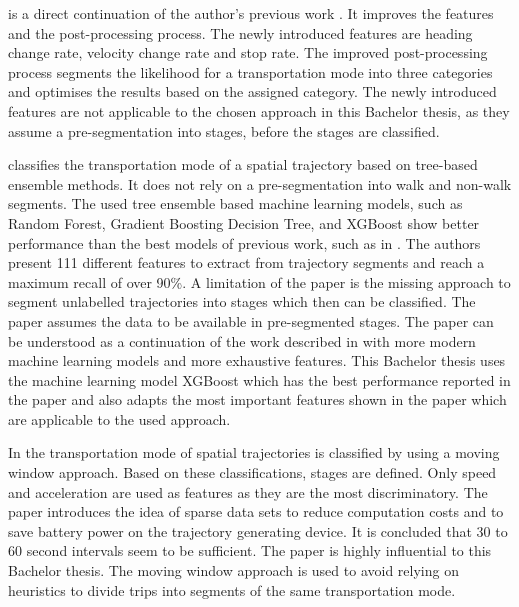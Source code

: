 \cite{zheng2008understanding} is a direct continuation of the author's previous work \cite{Zheng2008}. It improves the features and the post-processing process. The newly introduced features are heading change rate, velocity change rate and stop rate. The improved post-processing process segments the likelihood for a transportation mode into three categories and optimises the results based on the assigned category. \newline
The newly introduced features are not applicable to the chosen approach in this Bachelor thesis, as they assume a pre-segmentation into stages, before the stages are classified.

\cite{Xiao2017} classifies the transportation mode of a spatial trajectory based on tree-based ensemble methods. It does not rely on a pre-segmentation into walk and non-walk segments. The used tree ensemble based machine learning models, such as Random Forest, Gradient Boosting Decision Tree, and XGBoost show better performance than the best models of previous work, such as in \cite{Zheng2008}. The authors present 111 different features to extract from trajectory segments and reach a maximum recall of over 90\%. A limitation of the paper is the missing approach to segment unlabelled trajectories into stages which then can be classified. The paper assumes the data to be available in pre-segmented stages.\newline
The paper can be understood as a continuation of the work described in \cite{Zheng2008} with more modern machine learning models and more exhaustive features. This Bachelor thesis uses the machine learning model XGBoost which has the best performance reported in the paper and also adapts the most important features shown in the paper which are applicable to the used approach. \cite{chen2016xgboost}

In \cite{Bolbol2012} the transportation mode of spatial trajectories is classified by using a moving window approach. Based on these classifications, stages are defined. Only speed and acceleration are used as features as they are the most discriminatory. The paper introduces the idea of sparse data sets to reduce computation costs and to save battery power on the trajectory generating device. It is concluded that 30 to 60 second intervals seem to be sufficient.\newline
The paper is highly influential to this Bachelor thesis. The moving window approach is used to avoid relying on heuristics to divide trips into segments of the same transportation mode.

